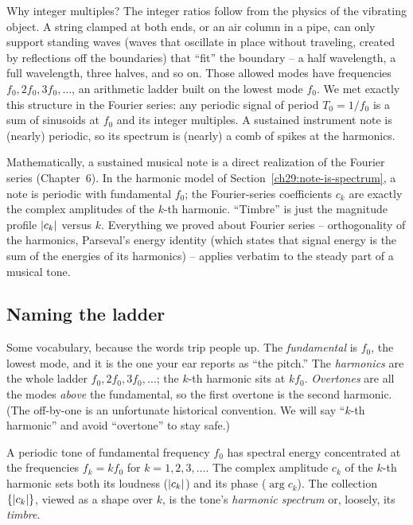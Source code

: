 Why integer multiples? The integer ratios follow from the physics
of the vibrating object. A string clamped at both ends, or an air column in a pipe, can only
support standing waves (waves that oscillate in place without traveling, created by reflections off the boundaries) that ``fit'' the boundary -- a half wavelength, a full wavelength, three
halves, and so on. Those allowed modes have frequencies $f_0, 2f_0, 3f_0, \dots$, an arithmetic
ladder built on the lowest mode $f_0$. We met exactly this structure in the Fourier series: any
periodic signal of period $T_0 = 1/f_0$ is a sum of sinusoids at $f_0$ and its integer multiples. A
sustained instrument note is (nearly) periodic, so its spectrum is (nearly) a comb of spikes at the
harmonics.

\begin{connectionbox}
Mathematically, a sustained musical note is a direct realization of the Fourier series (Chapter~6). In the harmonic model of Section~\ref{ch29:note-is-spectrum},
a note is periodic with fundamental $f_0$; the Fourier-series coefficients $c_k$ are exactly the
complex amplitudes of the $k$-th harmonic. ``Timbre'' is just the magnitude profile $\lvert c_k\rvert$
versus $k$. Everything we proved about Fourier series -- orthogonality of the harmonics, Parseval's
energy identity (which states that signal energy is the sum of the energies of its harmonics) -- applies verbatim to the steady part of a musical tone.
\end{connectionbox}

\subsection*{Naming the ladder}

Some vocabulary, because the words trip people up. The \emph{fundamental} is $f_0$, the lowest mode,
and it is the one your ear reports as ``the pitch.'' The \emph{harmonics} are the whole ladder $f_0,
2f_0, 3f_0, \dots$; the $k$-th harmonic sits at $k f_0$. \emph{Overtones} are all the modes
\emph{above} the fundamental, so the first overtone is the second harmonic. (The off-by-one is an
unfortunate historical convention. We will say ``$k$-th harmonic'' and avoid ``overtone'' to stay safe.)

\begin{definition}
\label{ch29:def-harmonics}
A periodic tone of fundamental frequency $f_0$ has spectral energy concentrated at the frequencies
$f_k = k f_0$ for $k = 1, 2, 3, \dots$. The complex amplitude $c_k$ of the $k$-th harmonic sets both
its loudness ($\lvert c_k\rvert$) and its phase ($\arg c_k$). The collection $\{\lvert c_k\rvert\}$, viewed as a
shape over $k$, is the tone's \emph{harmonic spectrum} or, loosely, its \emph{timbre}.
\end{definition}

